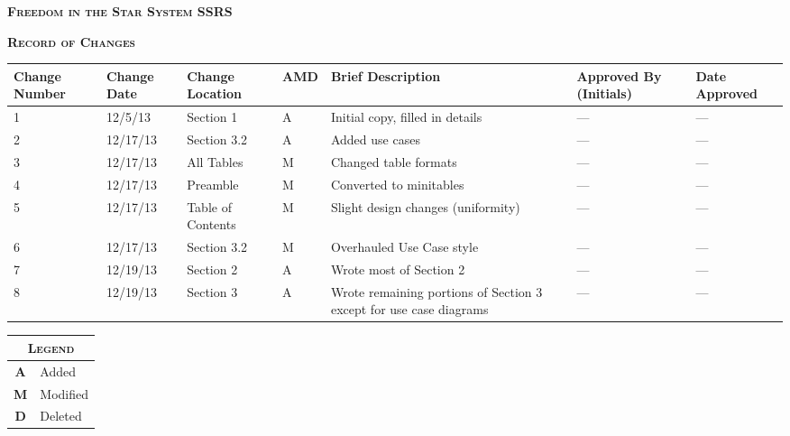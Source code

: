 \documentclass[twoside,letterpaper]{article}
\begin{document}
\clearpage
\begin{minipage}{\linewidth}
\centering
\textsc{
	\textbf{Freedom in the Star System SSRS}}

\vspace{2em}

\textsc{
	\textbf{Record of Changes}}
	
\end{minipage}

\begin{minipage}{\linewidth}
\centering
\begin{tabularx}{\textwidth}{XXXXPXX}\toprule[1.5pt] %

\bf Change Number & \bf Change Date & \bf Change Location & \bf A\newline M\newline D & \bf Brief \newline Description & \bf Approved By \newline (Initials) & \bf Date Approved \\ \midrule[1.0pt]

1 & 12/5/13 & Section 1 & A & Initial copy, filled in details & --- & ---\\
2 & 12/17/13 & Section 3.2 & A & Added use cases & --- & ---\\
3 & 12/17/13 & All Tables & M & Changed table formats & --- & ---\\
4 & 12/17/13 & Preamble & M & Converted to minitables & --- & ---\\
5 & 12/17/13 & Table of Contents & M & Slight design changes (uniformity) & --- & ---\\
6 & 12/17/13 & Section 3.2 & M & Overhauled Use Case style & --- & ---\\
7 & 12/19/13 & Section 2 & A & Wrote most of Section 2 & --- & ---\\
8 & 12/19/13 & Section 3 & A & Wrote remaining portions of Section 3 except for use case diagrams & --- & ---\\

\bottomrule[1.5pt]
\end{tabularx}\par

\bigskip
\raggedleft %
\begin{tabular}{c l}
\multicolumn{2}{c}{\textsc{Legend}} \\ \midrule[0.5pt]
\textsc{\textbf{A}}   & Added\\
\textsc{\textbf{M}}   & Modified\\
\textsc{\textbf{D}}	  & Deleted\\
\end{tabular}
\end{minipage}
\end{document}
